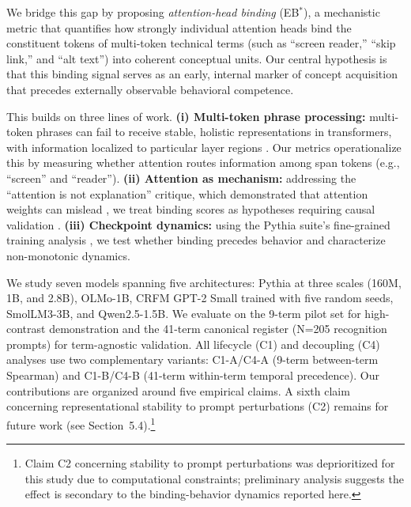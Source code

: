 \documentclass[10pt]{article} %
\begin{document}
We bridge this gap by proposing \emph{attention-head binding} (EB$^*$), a mechanistic metric that quantifies how strongly individual attention heads bind the constituent tokens of multi-token technical terms (such as ``screen reader,'' ``skip link,'' and ``alt text'') into coherent conceptual units.
Our central hypothesis is that this binding signal serves as an early, internal marker of concept acquisition that precedes externally observable behavioral competence.

\begin{sloppypar}
This builds on three lines of work.
\textbf{(i) Multi-token phrase processing:} multi-token phrases can fail to receive stable, holistic representations in transformers, with information localized to particular layer regions \citep{miletic2024semantics,haviv2023understanding}.  Our metrics operationalize this by measuring whether attention routes information among span tokens (e.g., ``screen'' and ``reader'').
\textbf{(ii) Attention as mechanism:} addressing the ``attention is not explanation'' critique, which demonstrated that attention weights can mislead \citep{jain2019attention,wiegreffe2019attention}, we treat binding scores as hypotheses requiring causal validation \citep{olsson2022context}.
\textbf{(iii) Checkpoint dynamics:} using the Pythia suite's fine-grained training analysis \citep{biderman2023pythia}, we test whether binding precedes behavior and characterize non-monotonic dynamics.
\end{sloppypar}

We study seven models spanning five architectures: Pythia at three scales (160M, 1B, and 2.8B), OLMo-1B, CRFM GPT-2 Small trained with five random seeds, SmolLM3-3B, and Qwen2.5-1.5B. We evaluate on the 9-term pilot set for high-contrast demonstration and the 41-term canonical register (N=205 recognition prompts) for term-agnostic validation.
All lifecycle (C1) and decoupling (C4) analyses use two complementary variants: C1-A/C4-A (9-term between-term Spearman) and C1-B/C4-B (41-term within-term temporal precedence).
Our contributions are organized around five empirical claims. A sixth claim concerning representational stability to prompt perturbations (C2) remains for future work (see Section~5.4).\footnote{Claim C2 concerning stability to prompt perturbations was deprioritized for this study due to computational constraints; preliminary analysis suggests the effect is secondary to the binding-behavior dynamics reported here.}
\end{document}
